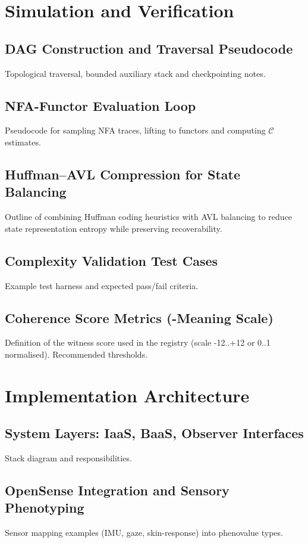 \documentclass[12pt,a4paper]{article}
\begin{document}
\section{Simulation and Verification}
\subsection{DAG Construction and Traversal Pseudocode}
Topological traversal, bounded auxiliary stack and checkpointing notes.

\subsection{NFA-Functor Evaluation Loop}
Pseudocode for sampling NFA traces, lifting to functors and computing
$\mathcal{C}$ estimates.

\subsection{Huffman--AVL Compression for State Balancing}
Outline of combining Huffman coding heuristics with AVL balancing to reduce
state representation entropy while preserving recoverability.

\subsection{Complexity Validation Test Cases}
Example test harness and expected pass/fail criteria.

\subsection{Coherence Score Metrics (\textDelta-Meaning Scale)}
Definition of the witness score used in the registry (scale -12..+12 or 0..1
normalised). Recommended thresholds.

\section{Implementation Architecture}
\subsection{System Layers: IaaS, BaaS, Observer Interfaces}
Stack diagram and responsibilities.

\subsection{OpenSense Integration and Sensory Phenotyping}
Sensor mapping examples (IMU, gaze, skin-response) into phenovalue types.
\end{document}
